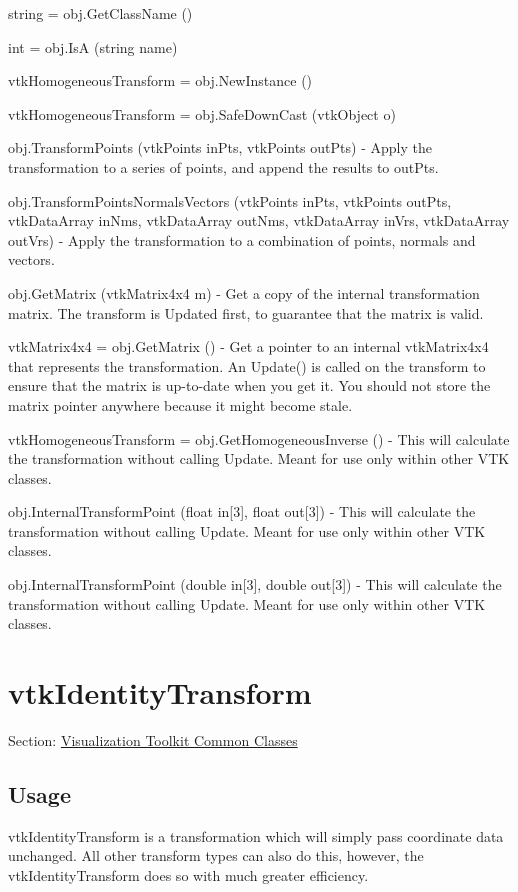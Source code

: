 \begin{DoxyItemize}
\item {\ttfamily string = obj.\-Get\-Class\-Name ()}  
\item {\ttfamily int = obj.\-Is\-A (string name)}  
\item {\ttfamily vtk\-Homogeneous\-Transform = obj.\-New\-Instance ()}  
\item {\ttfamily vtk\-Homogeneous\-Transform = obj.\-Safe\-Down\-Cast (vtk\-Object o)}  
\item {\ttfamily obj.\-Transform\-Points (vtk\-Points in\-Pts, vtk\-Points out\-Pts)} -\/ Apply the transformation to a series of points, and append the results to out\-Pts.  
\item {\ttfamily obj.\-Transform\-Points\-Normals\-Vectors (vtk\-Points in\-Pts, vtk\-Points out\-Pts, vtk\-Data\-Array in\-Nms, vtk\-Data\-Array out\-Nms, vtk\-Data\-Array in\-Vrs, vtk\-Data\-Array out\-Vrs)} -\/ Apply the transformation to a combination of points, normals and vectors.  
\item {\ttfamily obj.\-Get\-Matrix (vtk\-Matrix4x4 m)} -\/ Get a copy of the internal transformation matrix. The transform is Updated first, to guarantee that the matrix is valid.  
\item {\ttfamily vtk\-Matrix4x4 = obj.\-Get\-Matrix ()} -\/ Get a pointer to an internal vtk\-Matrix4x4 that represents the transformation. An Update() is called on the transform to ensure that the matrix is up-\/to-\/date when you get it. You should not store the matrix pointer anywhere because it might become stale.  
\item {\ttfamily vtk\-Homogeneous\-Transform = obj.\-Get\-Homogeneous\-Inverse ()} -\/ This will calculate the transformation without calling Update. Meant for use only within other V\-T\-K classes.  
\item {\ttfamily obj.\-Internal\-Transform\-Point (float in\mbox{[}3\mbox{]}, float out\mbox{[}3\mbox{]})} -\/ This will calculate the transformation without calling Update. Meant for use only within other V\-T\-K classes.  
\item {\ttfamily obj.\-Internal\-Transform\-Point (double in\mbox{[}3\mbox{]}, double out\mbox{[}3\mbox{]})} -\/ This will calculate the transformation without calling Update. Meant for use only within other V\-T\-K classes.  
\end{DoxyItemize}\hypertarget{vtkcommon_vtkidentitytransform}{}\section{vtk\-Identity\-Transform}\label{vtkcommon_vtkidentitytransform}
Section\-: \hyperlink{sec_vtkcommon}{Visualization Toolkit Common Classes} \hypertarget{vtkwidgets_vtkxyplotwidget_Usage}{}\subsection{Usage}\label{vtkwidgets_vtkxyplotwidget_Usage}
vtk\-Identity\-Transform is a transformation which will simply pass coordinate data unchanged. All other transform types can also do this, however, the vtk\-Identity\-Transform does so with much greater efficiency.

